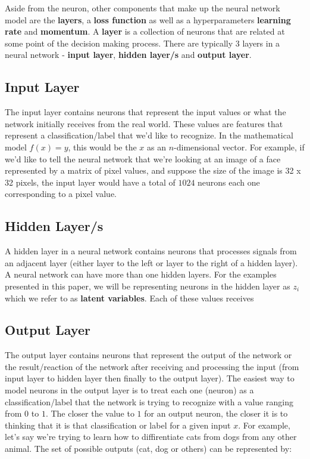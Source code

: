 \documentclass[a4paper]{article}
\begin{document}
Aside from the neuron, other components that make up the neural network model are the \textbf{layers}, a \textbf{loss function} as well as a hyperparameters \textbf{learning rate} and \textbf{momentum}. A \textbf{layer} is a collection of neurons that are related at some point of the decision making process. There are typically 3 layers in a neural network - \textbf{input layer}, \textbf{hidden layer/s} and \textbf{output layer}.

\subsection{Input Layer}
The input layer contains neurons that represent the input values or what the network initially receives from the real world. These values are features that represent a classification/label that we'd like to recognize. In the mathematical model $f(x) = y$, this would be the $x$ as an $n$-dimensional vector. For example, if we'd like to tell the neural network that we're looking at an image of a face represented by a matrix of pixel values, and suppose the size of the image is 32 x 32 pixels, the input layer would have a total of $1024$ neurons each one corresponding to a pixel value. 

\subsection{Hidden Layer/s}
A hidden layer in a neural network contains neurons that processes signals from an adjacent layer (either layer to the left or layer to the right of a hidden layer). A neural network can have more than one hidden layers. For the examples presented in this paper, we will be representing neurons in the hidden layer as $z_{i}$ which we refer to as \textbf{latent variables}. Each of these values receives 

\subsection{Output Layer}
The output layer contains neurons that represent the output of the network or the result/reaction of the network after receiving and processing the input (from input layer to hidden layer then finally to the output layer). The easiest way to model neurons in the output layer is to treat each one (neuron) as a classification/label that the network is trying to recognize with a value ranging from $0$ to $1$. The closer the value to $1$ for an output neuron, the closer it is to thinking that it is that classification or label for a given input $x$. For example, let's say we're trying to learn how to diffirentiate cats from dogs from any other animal. The set of possible outputs (cat, dog or others) can be represented by:
\end{document}
